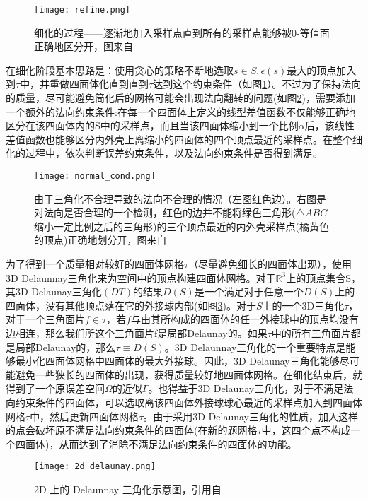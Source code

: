 \begin{figure}[htbp]
    \centering
    \texttt{[image: refine.png]}
    \caption{细化的过程——逐渐地加入采样点直到所有的采样点能够被0-等值面正确地区分开，图来自\cite{isotopic-appro}}
    \label{fig:refine}
\end{figure}

\par 在细化阶段基本思路是：使用贪心的策略不断地选取$s \in S,\epsilon(s)$最大的顶点加入到$\tau$中，并重做四面体化直到直到$\tau$达到这个约束条件（如图\ref{fig:refine}）。不过为了保持法向的质量，尽可能避免简化后的网格可能会出现法向翻转的问题(如图\ref{fig:normal-cond})，需要添加一个额外的法向约束条件:在每一个四面体上定义的线型差值函数不仅能够正确地区分在该四面体内的S中的采样点，而且当该四面体缩小到一个比例$\alpha$后，该线性差值函数也能够区分内外壳上离缩小的四面体的四个顶点最近的采样点。在整个细化的过程中，依次判断误差约束条件，以及法向约束条件是否得到满足。
\begin{figure}[htbp]
    \centering
    \texttt{[image: normal\_cond.png]}
    \caption{由于三角化不合理导致的法向不合理的情况（左图红色边）。右图是对法向是否合理的一个检测，红色的边并不能将绿色三角形($\triangle ABC$缩小一定比例之后的三角形)的三个顶点最近的内外壳采样点(橘黄色的顶点)正确地划分开，图来自\cite{isotopic-appro}}
    \label{fig:normal-cond}
\end{figure}
为了得到一个质量相对较好的四面体网格$\tau$（尽量避免细长的四面体出现），使用3D Delaunnay三角化来为空间中的顶点构建四面体网格。对于$\mathbb{R}^3$上的顶点集合S，其3D Delaunay三角化$(DT)$的结果$D(S)$是一个满足对于任意一个$D(S)$上的四面体，没有其他顶点落在它的外接球内部(如图\ref{fig:2d-delaunay})。对于$S$上的一个3D三角化$\tau$，对于一个三角面片$f \in \tau$，若$f$与由其所构成的四面体的任一外接球中的顶点均没有边相连，那么我们所这个三角面片f是局部Delaunay的。如果$\tau$中的所有三角面片都是局部Delaunay的，那么$\tau \equiv D(S)$。3D Delaunnay三角化的一个重要特点是能够最小化四面体网格中四面体的最大外接球。因此，3D Delaunay三角化能够尽可能避免一些狭长的四面体的出现，获得质量较好地四面体网格。在细化结束后，就得到了一个原误差空间$\Omega$的近似$\Gamma$。也得益于3D Delaunay三角化，对于不满足法向约束条件的四面体，可以选取离该四面体外接球球心最近的采样点加入到四面体网格$\tau$中，然后更新四面体网格$\tau$。由于采用3D Delaunay三角化的性质，加入这样的点会破坏原不满足法向约束条件的四面体(在新的题网格$\tau$中，这四个点不构成一个四面体)，从而达到了消除不满足法向约束条件的四面体的功能。
\begin{figure}[htbp]
    \centering
    \texttt{[image: 2d\_delaunay.png]}
    \caption{2D 上的 Delaunnay 三角化示意图，引用自\cite{delaunay-wiki}}
    \label{fig:2d-delaunay}
\end{figure}

